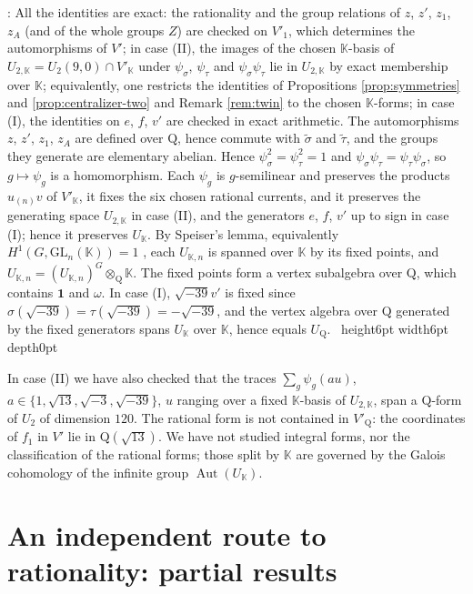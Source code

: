 \documentclass[leqno]{article}
\newcommand{\K}{\ensuremath{\mathbb{K}}}
\newcommand{\Q}{\mathrm{Q}}
\newcommand{\qed}{\hfill \vrule height6pt  width6pt depth0pt}
\newcommand{\ot}{\otimes}
\newenvironment{proof}[1][]{\noindent {\it Proof #1} : }{\hbox{~}\qed
\smallskip
}
\numberwithin{equation}{section}
\begin{document}
\begin{proof}
All the identities are exact: the rationality and the group relations of $z$, $z'$, $z_1$, $z_A$ (and of the whole groups $Z$) are checked on $V'_1$, which determines the automorphisms of $V'$; in case (II), the images of the chosen $\K$-basis of $U_{2,\K} = U_2(9,0) \cap V'_\K$ under $\psi_\sigma$, $\psi_\tau$ and $\psi_\sigma\psi_\tau$ lie in $U_{2,\K}$ by exact membership over $\K$; equivalently, one restricts the identities of Propositions \ref{prop:symmetries} and \ref{prop:centralizer-two} and Remark \ref{rem:twin} to the chosen $\K$-forms; in case (I), the identities on $e$, $f$, $v'$ are checked in exact arithmetic. The automorphisms $z$, $z'$, $z_1$, $z_A$ are defined over $\Q$, hence commute with $\tilde\sigma$ and $\tilde\tau$, and the groups they generate are elementary abelian. Hence $\psi_\sigma^2 = \psi_\tau^2 = 1$ and $\psi_\sigma\psi_\tau = \psi_\tau\psi_\sigma$, so $g \mapsto \psi_g$ is a homomorphism. Each $\psi_g$ is $g$-semilinear and preserves the products $u_{(n)}v$ of $V'_\K$, it fixes the six chosen rational currents, and it preserves the generating space $U_{2,\K}$ in case (II), and the generators $e$, $f$, $v'$ up to sign in case (I); hence it preserves $U_\K$. By Speiser's lemma, equivalently $H^1(G,\mathrm{GL}_n(\K)) = 1$ \cite[Chapter X, Proposition 3]{Ser79}, each $U_{\K,n}$ is spanned over $\K$ by its fixed points, and $U_{\K,n} = (U_{\K,n})^G \ot_\Q \K$. The fixed points form a vertex subalgebra over $\Q$, which contains $\mathbf 1$ and $\omega$. In case (I), $\sqrt{-39} v'$ is fixed since $\sigma(\sqrt{-39}) = \tau(\sqrt{-39}) = -\sqrt{-39}$, and the vertex algebra over $\Q$ generated by the fixed generators spans $U_\K$ over $\K$, hence equals $U_\Q$.
\end{proof}

In case (II) we have also checked that the traces $\sum_g \psi_g(au)$, $a \in \{1,\sqrt{13},\sqrt{-3},\sqrt{-39}\}$, $u$ ranging over a fixed $\K$-basis of $U_{2,\K}$, span a $\Q$-form of $U_2$ of dimension $120$. The rational form is not contained in $V'_\Q$: the coordinates of $f_1$ in $V'$ lie in $\Q(\sqrt{13})$. We have not studied integral forms, nor the classification of the rational forms; those split by $\K$ are governed by the Galois cohomology of the infinite group $\operatorname{Aut}(U_\K)$.

\section{An independent route to rationality: partial results}
\label{sec:existence}
\end{document}

